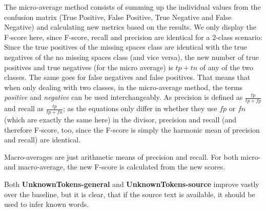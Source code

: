 \documentclass[a4paper,10pt]{scrartcl}
\theoremstyle{style}
\begin{document}
The micro-average method consists of summing up the individual values from the confusion matrix (True Positive, False Positive, True Negative and False Negative) and calculating new metrics based on the results. We only display the F-score here, since F-score, recall and precision are identical for a 2-class scenario: Since the true positives of the missing spaces class are identical with the true negatives of the no missing spaces class (and vice versa), the new number of true positives and true negatives (for the micro average) is $tp + tn$ of any of the two classes. The same goes for false negatives and false positives. That means that when only dealing with two classes, in the micro-average method, the terms \textit{positive} and \textit{negative} can be used interchangeably. As precision is defined as $\frac{tp}{tp+fp}$ and recall as $\frac{tp}{tp+fn}$; as the equations only differ in whether they use $fp$ or $fn$ (which are exactly the same here) in the divisor, precision and recall (and therefore F-score, too, since the F-score is simply the harmonic mean of precision and recall) are identical.

Macro-averages are just arithmetic means of precision and recall. For both micro- and macro-average, the new F-score is calculated from the new scores.

Both \textbf{UnknownTokens-general} and \textbf{UnknownTokens-source} improve vastly over the baseline, but it is clear, that if the source text is available, it should be used to infer known words.
\end{document}

